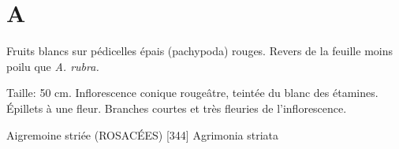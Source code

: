 



\begin{titlingpage}
\maketitle
\end{titlingpage}


\showgreek
\newpage

\raggedbottom

\chapter*{A}


\lipsum[66]


\herbskip


Fruits blancs sur pédicelles épais (pachypoda) rouges.
Revers de la feuille moins poilu que \emph{A. rubra.}

\herbskip


\lipsum[75]

\herbskip


\lipsum[66]

\herbskip
				

Taille: 50 cm. Inflorescence conique rougeâtre,
teintée du blanc des étamines. Épillets à une fleur.
Branches courtes et très fleuries de l’inflorescence.






\newpage

Aigremoine striée (ROSACÉES)  [344]
				Agrimonia striata\\

